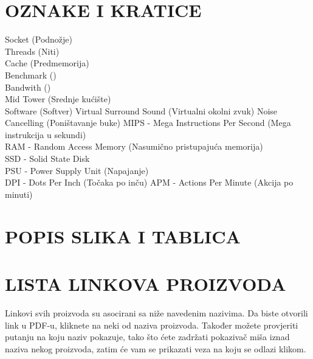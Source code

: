\documentclass[14pt]{article}
\begin{document}
\clearpage
\section{OZNAKE I KRATICE}
Socket (Podnožje) \\
Threads (Niti) \\
Cache (Predmemorija) \\
Benchmark () \\
Bandwith () \\
Mid Tower (Srednje kućište) \\
Software (Softver)
Virtual Surround Sound (Virtualni okolni zvuk)
Noise Cancelling (Poništavanje buke)
MIPS - Mega Instructions Per Second (Mega instrukcija u sekundi) \\
RAM - Random Access Memory (Nasumično pristupajuća memorija) \\
SSD - Solid State Disk \\
PSU - Power Supply Unit (Napajanje) \\
DPI - Dots Per Inch (Točaka po inču)
APM - Actions Per Minute (Akcija po minuti)

\clearpage
\section{POPIS SLIKA I TABLICA}
\listoffigures
\listoftables

\clearpage
\section{LISTA LINKOVA PROIZVODA}
Linkovi svih proizvoda su asocirani sa niže navedenim nazivima. Da biste otvorili link u PDF-u, kliknete na neki od naziva proizvoda. Također možete provjeriti putanju na koju naziv pokazuje, tako što ćete zadržati pokazivač miša iznad naziva nekog proizvoda, zatim će vam se prikazati veza na koju se odlazi klikom.
\end{document}
